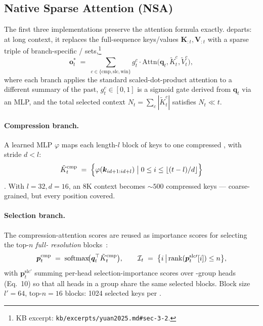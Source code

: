 \subsection{Native Sparse Attention (NSA)}
\label{sec:nsa}

The first three implementations preserve the attention formula
exactly.  \citep{yuan2025} departs: at long context, it replaces
the full-sequence keys/values $\boldsymbol{K}_{:t}, \boldsymbol{V}_{:t}$
with a sparse triple of branch-specific /
sets,\footnote{KB excerpt: \texttt{kb/excerpts/yuan2025.md\#sec-3-2}.}
\begin{equation}
  \boldsymbol{o}_t^* \;=\; \sum_{c \in \{\mathrm{cmp}, \mathrm{slc}, \mathrm{win}\}}
                          g_t^c \cdot \mathrm{Attn}\!\bigl(\boldsymbol{q}_t,
                                                        \tilde K_t^c,
                                                        \tilde V_t^c\bigr),
  \label{eq:nsa-three-branch}
\end{equation}
where each branch applies the standard scaled-dot-product attention to
a different summary of the past, $g_t^c \in [0, 1]$ is a sigmoid gate
derived from $\boldsymbol{q}_t$ via an MLP, and the total selected
context $N_t = \sum_c |\tilde K_t^c|$ satisfies $N_t \ll t$.

\paragraph{Compression branch.} A learned MLP $\varphi$ maps each
length-$l$ block of keys to one compressed , with stride $d < l$:
\begin{equation}
  \tilde K_t^{\mathrm{cmp}} \;=\;
    \Bigl\{\varphi(\boldsymbol{k}_{i d + 1 : i d + l})
      \;\big|\; 0 \le i \le \lfloor (t - l) / d \rfloor\Bigr\}
  \label{eq:nsa-cmp}
\end{equation}
\citep[\S 3.3.1]{yuan2025}. With $l = 32, d = 16$, an 8K context
becomes $\sim\!500$ compressed keys --- coarse-grained, but every
position covered.

\paragraph{Selection branch.} The compression-attention scores are
reused as importance scores for selecting the top-$n$ \emph{full-
resolution} blocks~\citep[\S 3.3.2 Eq.~8--12]{yuan2025}:
\begin{equation}
  \boldsymbol{p}_t^{\mathrm{cmp}} \;=\; \operatorname{softmax}\!\bigl(\boldsymbol{q}_t^\top \tilde K_t^{\mathrm{cmp}}\bigr),
  \qquad
  \mathcal{I}_t \;=\; \bigl\{i \,\big|\, \mathrm{rank}(\boldsymbol{p}_t^{\mathrm{slc}\prime}[i]) \le n\bigr\},
  \label{eq:nsa-select}
\end{equation}
with $\boldsymbol{p}_t^{\mathrm{slc}\prime}$ summing per-head
selection-importance scores over -group heads (Eq.~10) so that all
heads in a  group share the same selected blocks. Block size
$l' = 64$, top-$n = 16$ blocks: 1024 selected keys per .

